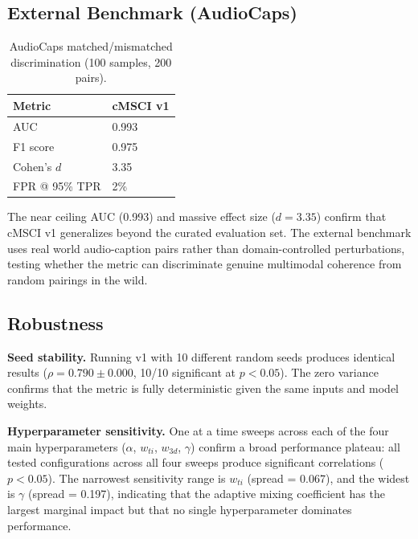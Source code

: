 \documentclass[a4paper,fleqn]{cas-sc}
\begin{document}
\begin{itemize}
\subsection{External Benchmark (AudioCaps)}\label{sec:audiocaps}

\begin{table}[t]
\caption{AudioCaps matched/mismatched discrimination (100 samples, 200 pairs).}\label{tab:audiocaps}
\centering
\begin{tabular}{ll}
\toprule
Metric & cMSCI v1 \\
\midrule
AUC & 0.993 \\
F1 score & 0.975 \\
Cohen's $d$ & 3.35 \\
FPR @ 95\% TPR & 2\% \\
\bottomrule
\end{tabular}
\end{table}

The near ceiling AUC (0.993) and massive effect size ($d = 3.35$) confirm that cMSCI v1 generalizes beyond the curated evaluation set. The external benchmark uses real world audio-caption pairs rather than domain-controlled perturbations, testing whether the metric can discriminate genuine multimodal coherence from random pairings in the wild.

\subsection{Robustness}\label{sec:robustness}

\textbf{Seed stability.} Running v1 with 10 different random seeds produces identical results ($\rho = 0.790 \pm 0.000$, 10/10 significant at $p < 0.05$). The zero variance confirms that the metric is fully deterministic given the same inputs and model weights.

\textbf{Hyperparameter sensitivity.} One at a time sweeps across each of the four main hyperparameters ($\alpha$, $w_{ti}$, $w_{3d}$, $\gamma$) confirm a broad performance plateau: all tested configurations across all four sweeps produce significant correlations ($p < 0.05$). The narrowest sensitivity range is $w_{ti}$ (spread = 0.067), and the widest is $\gamma$ (spread = 0.197), indicating that the adaptive mixing coefficient has the largest marginal impact but that no single hyperparameter dominates performance.


\end{itemize}
\end{document}
